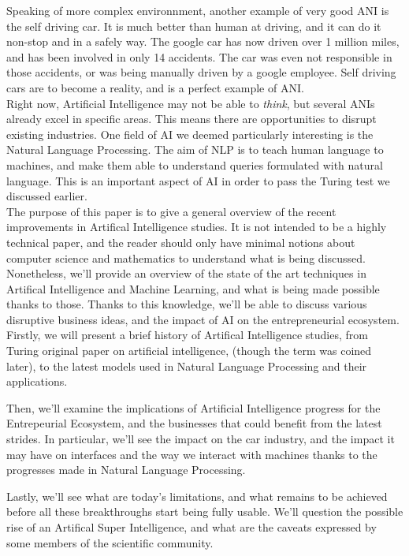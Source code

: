 \documentclass[12pt]{article}
\begin{document}
Speaking of more complex environnment, another example of very good \gls{ANI} is
the self driving car. It is much better than human at driving, and it can do it
non-stop and in a safely way. The google car has now driven over 1 million miles,
and has been involved in only 14 accidents. The car was even not responsible in
those accidents, or was being manually driven by a google employee. Self driving
cars are to become a reality, and is a perfect example of \gls{ANI}.
\\

Right now, Artificial Intelligence may not be able to {\em think}, but several
ANIs already excel in specific areas. This means there are opportunities to
disrupt existing industries. One field of AI we deemed particularly interesting
is the Natural Language Processing. The aim of NLP is to teach human language to
machines, and make them able to understand queries formulated with natural
language. This is an important aspect of AI in order to pass the Turing test we
discussed earlier.
\\


The purpose of this paper is to give a general overview of the recent
improvements in Artifical Intelligence studies. It is not intended to be a
highly technical paper, and the reader should only have minimal notions about
computer science and mathematics to understand what is being discussed.
Nonetheless, we'll provide an overview of the state of the art
techniques in Artifical Intelligence and Machine Learning, and what is being
made possible thanks to those. Thanks to this knowledge, we'll be able to
discuss various disruptive business ideas, and the impact of AI on the
entrepreneurial ecosystem.
\\

Firstly, we will present a brief history of Artifical
Intelligence studies, from Turing original paper on artificial intelligence,
(though the term was coined later), to the latest models used in Natural
Language Processing and their applications.

\noindent Then, we'll examine the implications of Artificial Intelligence
progress for the Entrepeurial Ecosystem, and the businesses that could benefit
from the latest strides. In particular, we'll see the impact on the car
industry, and the impact it may have on interfaces and the way we interact with
machines thanks to the progresses made in Natural Language Processing.

\noindent Lastly, we'll see what are today's limitations, and what remains to be
achieved before all these breakthroughs start being fully usable. We'll question
the possible rise of an Artifical Super Intelligence, and what are the caveats
expressed by some members of the scientific community.
\end{document}
